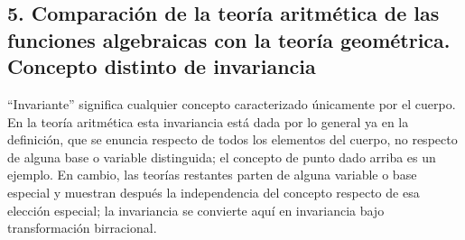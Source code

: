 \documentclass[11pt]{article}
\begin{document}
\subsection*{5. Comparación de la teoría aritmética de las funciones algebraicas con la teoría geométrica. Concepto distinto de invariancia}
``Invariante'' significa cualquier concepto caracterizado únicamente por el cuerpo. En la teoría aritmética esta invariancia está dada por lo general ya en la definición, que se enuncia respecto de todos los elementos del cuerpo, no respecto de alguna base o variable distinguida; el concepto de punto dado arriba es un ejemplo. En cambio, las teorías restantes parten de alguna variable o base especial y muestran después la independencia del concepto respecto de esa elección especial; la invariancia se convierte aquí en invariancia bajo transformación birracional.
\end{document}
